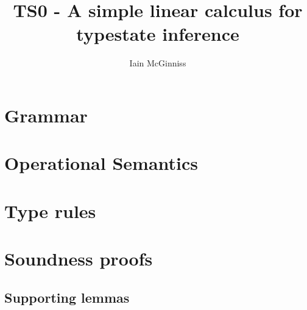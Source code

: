 \documentclass{article}
\begin{document}
\title{TS0 - A simple linear calculus for typestate inference}
\author{Iain McGinniss}

\section{Grammar}

\ottgrammartabular{
\ottt\ottinterrule
\ottv\ottinterrule
\otto\ottinterrule
\ottsv\ottinterrule
\ottT\ottinterrule
\ottst\ottinterrule
\ottO\ottinterrule
}

\section{Operational Semantics}

\ottgrammartabular{
\ottmu\ottinterrule
}

\ottdefnvalidstore

\ottdefnreduce

\section{Type rules}

\ottgrammartabular{
\ottG\ottinterrule
\ottT\ottinterrule
}

\ottdefnvalidgamma

\ottdefnstoretype

\ottdefnmethtype

\ottdefntype

\section{Soundness proofs}

\subsection{Supporting lemmas}
\end{document}
